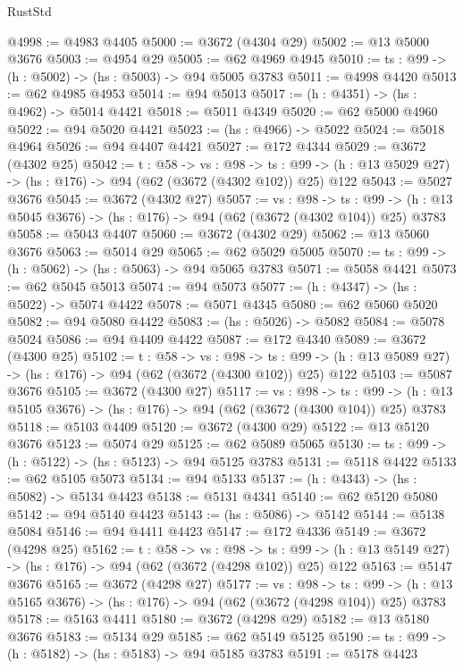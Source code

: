 \begin{lexlean}{RustStd}
\begin{coremodule}
@4998 := @4983 @4405
@5000 := @3672 (@4304 @29)
@5002 := @13 @5000 @3676
@5003 := @4954 @29
@5005 := @62 @4969 @4945
@5010 := {ts : @99} -> (h : @5002) -> (hs : @5003) -> @94 @5005 @3783
@5011 := @4998 @4420
@5013 := @62 @4985 @4953
@5014 := @94 @5013
@5017 := (h : @4351) -> (hs : @4962) -> @5014 @4421
@5018 := @5011 @4349
@5020 := @62 @5000 @4960
@5022 := @94 @5020 @4421
@5023 := (hs : @4966) -> @5022
@5024 := @5018 @4964
@5026 := @94 @4407 @4421
@5027 := @172 @4344
@5029 := @3672 (@4302 @25)
@5042 := {t : @58} ->
  {vs : @98} ->
  {ts : @99} -> (h : @13 @5029 @27) -> (hs : @176) -> @94 (@62 (@3672 (@4302 @102)) @25) @122
@5043 := @5027 @3676
@5045 := @3672 (@4302 @27)
@5057 := {vs : @98} ->
  {ts : @99} -> (h : @13 @5045 @3676) -> (hs : @176) -> @94 (@62 (@3672 (@4302 @104)) @25) @3783
@5058 := @5043 @4407
@5060 := @3672 (@4302 @29)
@5062 := @13 @5060 @3676
@5063 := @5014 @29
@5065 := @62 @5029 @5005
@5070 := {ts : @99} -> (h : @5062) -> (hs : @5063) -> @94 @5065 @3783
@5071 := @5058 @4421
@5073 := @62 @5045 @5013
@5074 := @94 @5073
@5077 := (h : @4347) -> (hs : @5022) -> @5074 @4422
@5078 := @5071 @4345
@5080 := @62 @5060 @5020
@5082 := @94 @5080 @4422
@5083 := (hs : @5026) -> @5082
@5084 := @5078 @5024
@5086 := @94 @4409 @4422
@5087 := @172 @4340
@5089 := @3672 (@4300 @25)
@5102 := {t : @58} ->
  {vs : @98} ->
  {ts : @99} -> (h : @13 @5089 @27) -> (hs : @176) -> @94 (@62 (@3672 (@4300 @102)) @25) @122
@5103 := @5087 @3676
@5105 := @3672 (@4300 @27)
@5117 := {vs : @98} ->
  {ts : @99} -> (h : @13 @5105 @3676) -> (hs : @176) -> @94 (@62 (@3672 (@4300 @104)) @25) @3783
@5118 := @5103 @4409
@5120 := @3672 (@4300 @29)
@5122 := @13 @5120 @3676
@5123 := @5074 @29
@5125 := @62 @5089 @5065
@5130 := {ts : @99} -> (h : @5122) -> (hs : @5123) -> @94 @5125 @3783
@5131 := @5118 @4422
@5133 := @62 @5105 @5073
@5134 := @94 @5133
@5137 := (h : @4343) -> (hs : @5082) -> @5134 @4423
@5138 := @5131 @4341
@5140 := @62 @5120 @5080
@5142 := @94 @5140 @4423
@5143 := (hs : @5086) -> @5142
@5144 := @5138 @5084
@5146 := @94 @4411 @4423
@5147 := @172 @4336
@5149 := @3672 (@4298 @25)
@5162 := {t : @58} ->
  {vs : @98} ->
  {ts : @99} -> (h : @13 @5149 @27) -> (hs : @176) -> @94 (@62 (@3672 (@4298 @102)) @25) @122
@5163 := @5147 @3676
@5165 := @3672 (@4298 @27)
@5177 := {vs : @98} ->
  {ts : @99} -> (h : @13 @5165 @3676) -> (hs : @176) -> @94 (@62 (@3672 (@4298 @104)) @25) @3783
@5178 := @5163 @4411
@5180 := @3672 (@4298 @29)
@5182 := @13 @5180 @3676
@5183 := @5134 @29
@5185 := @62 @5149 @5125
@5190 := {ts : @99} -> (h : @5182) -> (hs : @5183) -> @94 @5185 @3783
@5191 := @5178 @4423

\end{coremodule}
\end{lexlean}

